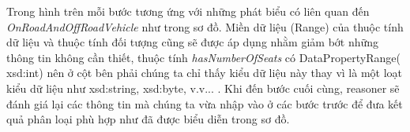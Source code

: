 Trong hình trên mỗi bước tương ứng với những phát biểu có liên quan đến \textit{OnRoadAndOffRoadVehicle} như trong sơ đồ. Miền dữ liệu (Range) của thuộc tính dữ liệu và thuộc tính đối tượng cũng sẽ được áp dụng nhằm giảm bớt những thông tin không cần thiết, thuộc tính \textit{hasNumberOfSeats} có DataPropertyRange( xsd:int) nên ở cột bên phải chúng ta chỉ thấy kiểu dữ liệu này thay vì là một loạt kiểu dữ liệu như xsd:string, xsd:byte, v.v... . Khi đến bước cuối cùng, reasoner sẽ đánh giá lại các thông tin mà chúng ta vừa nhập vào ở các bước trước để đưa kết quả phân loại phù hợp như đã được biểu diễn trong sơ đồ.